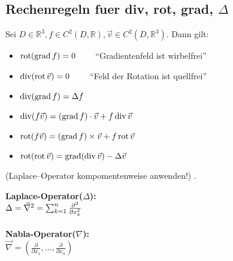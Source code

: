 \subsection{Rechenregeln fuer div, rot, grad, $\Delta$}
\begin{minipage}{9cm}
Sei $D \in \mathbb{R}^3, f \in C^2(D,\mathbb{R}), \vec{v} \in C^2(D,\mathbb{R}^3)$. Dann gilt:
\begin{itemize}
	\item $\operatorname{rot}(\operatorname{grad} f) = 0 \qquad $ ``Gradientenfeld ist wirbelfrei''
	\item $\operatorname{div}(\operatorname{rot} \vec{v}) = 0 \qquad $ ``Feld der Rotation ist quellfrei''
	\item $\operatorname{div}(\operatorname{grad} f) = \Delta f$
	\item $\operatorname{div}(f\vec{v}) = (\operatorname{grad} f) \cdot \vec{v} + f \operatorname{div} \vec{v}$
	\item $\operatorname{rot}(f\vec{v}) = (\operatorname{grad} f) \times \vec{v} + f \operatorname{rot} \vec{v}$
	\item $\operatorname{rot}(\operatorname{rot} \vec{v}) = \operatorname{grad}(\operatorname{div} \vec{v}) - \Delta \vec{v}$
\end{itemize}
(Laplace–Operator kompomentenweise anwenden!) .
\end{minipage}
\hspace{1cm}
\begin{minipage}[b]{6cm}
\textbf{Laplace-Operator($\Delta$):}\\
$\Delta=\vec\nabla^2= \sum_{k=1}^n {\partial^2\over \partial x_k^2}$\\\\
\textbf{ Nabla-Operator($\nabla$):}\\
$\vec\nabla = \left (\frac\partial{\partial x_1},\ldots, \frac\partial{\partial
x_n}\right) $
\end{minipage}
\newpage
%

\newpage



